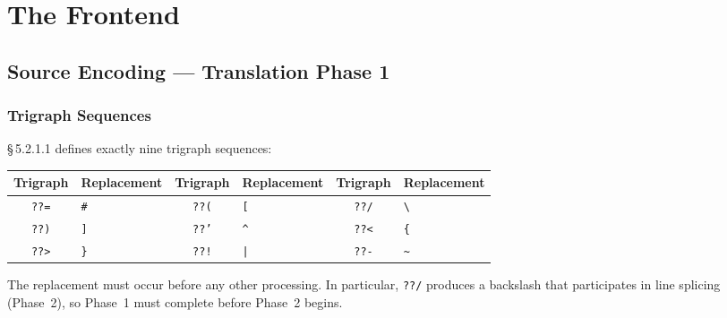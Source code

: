 \documentclass[11pt,a4paper,twoside,openright,DIV=15]{scrbook}
\theoremstyle{definition}
\theoremstyle{plain}
\theoremstyle{remark}
\newcommand{\stdref}[1]{\S\,#1}
\begin{document}
\part{The Frontend}

%
%

\chapter{Source Encoding --- Translation Phase 1}
\label{ch:source-encoding}

\section{Trigraph Sequences}

\stdref{5.2.1.1} defines exactly nine trigraph sequences:

\begin{center}
\begin{tabular}{cl@{\qquad}cl@{\qquad}cl}
\hline
Trigraph & Replacement & Trigraph & Replacement & Trigraph & Replacement \\
\hline
\texttt{??=} & \texttt{\#} & \texttt{??(} & \texttt{[} & \texttt{??/} & \texttt{\textbackslash} \\
\texttt{??)} & \texttt{]} & \texttt{??'} & \texttt{\^{}} & \texttt{??<} & \texttt{\{} \\
\texttt{??>} & \texttt{\}} & \texttt{??!} & \texttt{|} & \texttt{??-} & \texttt{\~{}} \\
\hline
\end{tabular}
\end{center}

The replacement must occur before any other processing.  In particular,
\texttt{??/} produces a backslash that participates in line splicing
(Phase~2), so Phase~1 must complete before Phase~2 begins.
\end{document}
